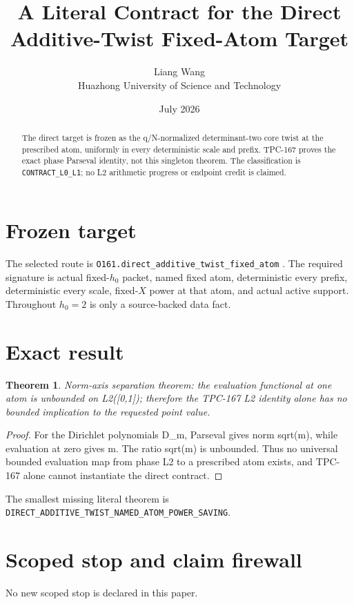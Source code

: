 \documentclass[11pt]{article}
\title{\textbf{A Literal Contract for the Direct Additive-Twist Fixed-Atom Target}}
\author{Liang Wang\\Huazhong University of Science and Technology}
\date{July 2026}
\newtheorem{theorem}{Theorem}
\begin{document}
\maketitle
\begin{abstract}
The direct target is frozen as the q/N-normalized determinant-two core twist at the prescribed atom, uniformly in every deterministic scale and prefix.  TPC-167 proves the exact phase Parseval identity, not this singleton theorem.
The classification is \texttt{CONTRACT\_\allowbreak{}L0\_\allowbreak{}L1}; no L2 arithmetic
progress or endpoint credit is claimed.
\end{abstract}

\section{Frozen target}
The selected route is \texttt{O161.direct\_\allowbreak{}additive\_\allowbreak{}twist\_\allowbreak{}fixed\_\allowbreak{}atom} \citep{TPC182}.  The required
signature is actual fixed-$h_0$ packet, named fixed atom, deterministic every
prefix, deterministic every scale, fixed-$X$ power at that atom, and actual
active support.  Throughout $h_0=2$ is only a source-backed data fact.

\section{Exact result}
\begin{theorem}
Norm-axis separation theorem: the evaluation functional at one atom is unbounded on L2([0,1]); therefore the TPC-167 L2 identity alone has no bounded implication to the requested point value.
\end{theorem}
\begin{proof}
For the Dirichlet polynomials D\_\allowbreak{}m, Parseval gives norm sqrt(m), while evaluation at zero gives m.  The ratio sqrt(m) is unbounded. Thus no universal bounded evaluation map from phase L2 to a prescribed atom exists, and TPC-167 alone cannot instantiate the direct contract.
\end{proof}

The smallest missing literal theorem is
\texttt{DIRECT\_\allowbreak{}ADDITIVE\_\allowbreak{}TWIST\_\allowbreak{}NAMED\_\allowbreak{}ATOM\_\allowbreak{}POWER\_\allowbreak{}SAVING}.

\section{Scoped stop and claim firewall}
No new scoped stop is declared in this paper.
\end{document}
